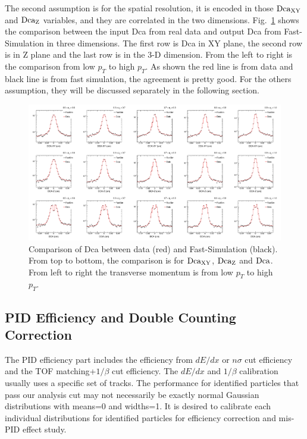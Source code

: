 \documentclass[a4paper]{article}
\begin{document}
The second assumption is for the spatial resolution, it is encoded in those $\textup{Dca}_{\textup{XY}}$ and $\textup{Dca}_{\textup{Z}}$ variables, and they are correlated in the two dimensions. Fig.~\ref{assumption2} shows the comparison between the input Dca from real data and output Dca from Fast-Simulation in three dimensions. The first row is Dca in XY plane, the second row is in Z plane and the last row is in the 3-D dimension. From the left to right is the comparison from low $p_{T}$ to high $p_{T}$. As shown the red line is from data and black line is from fast simulation, the agreement is pretty good.
For the others assumption, they will be discussed separately in the following section.

\begin{figure}[htbp]
\centering
\includegraphics[keepaspectratio,width=1.0\textwidth]{fig/assumption2.png}
\caption{Comparison of Dca between data (red) and Fast-Simulation (black). From top to bottom, the comparison is for $\textup{Dca}_{\textup{XY}}$, $\textup{Dca}_{\textup{Z}}$ and $\textup{Dca}$. From left to right the transverse momentum is from low $p_T$ to high $p_T$.}
\label{assumption2}
\end{figure}


\subsection{PID Efficiency and Double Counting Correction}

The PID efficiency part includes the efficiency from $dE/dx$ or $n\sigma$ cut efficiency and the TOF matching+$1/\beta$ cut efficiency. The $dE/dx$ and $1/\beta$ calibration usually uses a specific set of tracks. The performance for identified particles that pass our analysis cut may not necessarily be exactly normal Gaussian distributions with means=0 and widths=1. It is desired to calibrate each individual distributions for identified particles for efficiency correction and mis-PID effect study.
\end{document}
